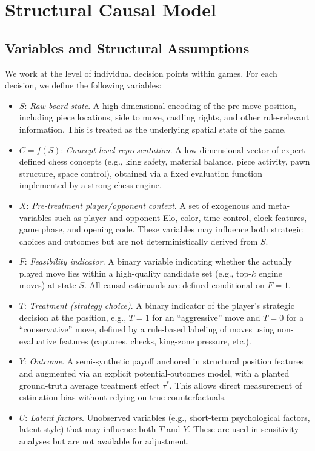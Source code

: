 \documentclass[11pt]{article}
\begin{document}
\section*{Structural Causal Model}

\subsection*{Variables and Structural Assumptions}

We work at the level of individual decision points within games. For each decision,
we define the following variables:

\begin{itemize}
\item \(S\): \emph{Raw board state}. A high-dimensional encoding of the pre-move
position, including piece locations, side to move, castling rights, and other
rule-relevant information. This is treated as the underlying spatial state of the
game.
\item \(C = f(S)\): \emph{Concept-level representation}. A low-dimensional vector
of expert-defined chess concepts (e.g., king safety, material balance, piece
activity, pawn structure, space control), obtained via a fixed evaluation function
implemented by a strong chess engine.\cite{lemeire2005causalmodelsinchess,stockfish}
\item \(X\): \emph{Pre-treatment player/opponent context}. A set of exogenous and
meta-variables such as player and opponent Elo, color, time control, clock features,
game phase, and opening code. These variables may influence both strategic choices
and outcomes but are not deterministically derived from \(S\).
\item \(F\): \emph{Feasibility indicator}. A binary variable indicating whether the
actually played move lies within a high-quality candidate set (e.g., top-\(k\)
engine moves) at state \(S\). All causal estimands are defined conditional on
\(F=1\).
\item \(T\): \emph{Treatment (strategy choice)}. A binary indicator of the player's
strategic decision at the position, e.g., \(T=1\) for an ``aggressive'' move and
\(T=0\) for a ``conservative'' move, defined by a rule-based labeling of moves
using non-evaluative features (captures, checks, king-zone pressure, etc.).
\item \(Y\): \emph{Outcome}. A semi-synthetic payoff anchored in structural position
features and augmented via an explicit potential-outcomes model, with a planted
ground-truth average treatment effect $\tau^*$. This allows direct measurement of
estimation bias without relying on true counterfactuals.
\item \(U\): \emph{Latent factors}. Unobserved variables (e.g., short-term
psychological factors, latent style) that may influence both \(T\) and \(Y\). These
are used in sensitivity analyses but are not available for adjustment.
\end{itemize}
\end{document}
